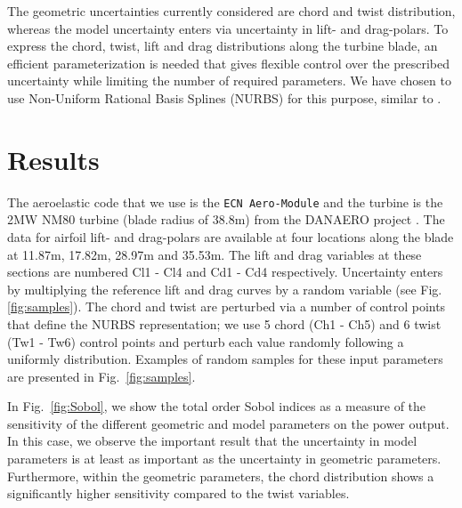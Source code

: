 \documentclass[11pt]{article}
\begin{document}
The geometric uncertainties currently considered are chord and twist distribution, whereas the model uncertainty enters via uncertainty in lift- and drag-polars. To express the chord, twist, lift and drag distributions along the turbine blade, an efficient parameterization is needed that gives flexible control over the prescribed uncertainty while limiting the number of required parameters. We have chosen to use Non-Uniform Rational Basis Splines (NURBS) for this purpose, similar to \cite{Echeverria2017}. 

\section{Results}
The aeroelastic code that we use is the \texttt{ECN Aero-Module} \cite{Boorsma2012} and the turbine is the 2MW NM80 turbine (blade radius of 38.8m) from the DANAERO project \cite{Troldborg2013}. The data for airfoil lift- and drag-polars are available at four locations along the blade at 11.87m, 17.82m, 28.97m and 35.53m. %
The lift and drag variables at these sections are numbered Cl1 - Cl4 and Cd1 - Cd4 respectively. Uncertainty enters by multiplying the reference lift and drag curves by a random variable (see Fig. \ref{fig:samples}). The chord and twist are perturbed via a number of control points that define the NURBS representation; we use 5 chord (Ch1 - Ch5) and 6 twist (Tw1 - Tw6) control points and perturb each value randomly following a uniformly distribution. Examples of random samples for these input parameters are presented in Fig.~\ref{fig:samples}.

In Fig.~\ref{fig:Sobol}, we show the total order Sobol indices as a measure of the sensitivity of the different geometric and model parameters on the power output. In this case, we observe the important result that the uncertainty in model parameters is at least as important as the uncertainty in geometric parameters. Furthermore, within the geometric parameters, the chord distribution shows a significantly higher sensitivity compared to the twist variables.
\end{document}
